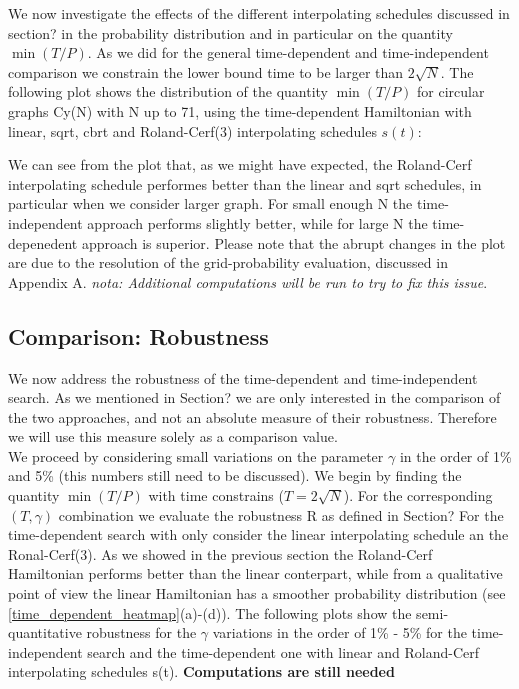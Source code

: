 
        We now investigate the effects of the different interpolating schedules discussed in section? in the probability distribution and in particular on the quantity $\min(T/P)$. As we did for the general time-dependent and time-independent comparison we constrain the lower bound time to be larger than $2\sqrt{N}$.
        The following plot shows the distribution of the quantity $\min(T/P)$ for circular graphs Cy(N) with N up to 71, using the time-dependent Hamiltonian with linear, sqrt, cbrt and Roland-Cerf(3) interpolating schedules $s(t)$:



        \noindent
        We can see from the plot that, as we might have expected, the Roland-Cerf interpolating schedule performes better than the linear and sqrt schedules, in particular when we consider larger graph. For small enough N the time-independent approach performs slightly better, while for large N the time-depenedent approach is superior. Please note that the abrupt changes in the plot are due to the resolution of the grid-probability evaluation, discussed in Appendix A. \textit{nota: Additional computations will be run to try to fix this issue}.


    \subsection{Comparison: Robustness}
    We now address the robustness of the time-dependent and time-independent search. As we mentioned in Section? we are only interested in the comparison of the two approaches, and not an absolute measure of their robustness. Therefore we will use this measure solely as a comparison value. \\
    We proceed by considering small variations on the parameter $\gamma$ in the order of 1\% and 5\% (this numbers still need to be discussed). We begin by finding the quantity $\min(T/P)$ with time constrains ($T = 2\sqrt{N}$). For the corresponding $(T,\gamma)$ combination we evaluate the robustness R as defined in Section?
    For the time-dependent search with only consider the linear interpolating schedule an the Ronal-Cerf(3). As we showed in the previous section the Roland-Cerf Hamiltonian performs better than the linear conterpart, while from a qualitative point of view the linear Hamiltonian has a smoother probability distribution (see \cref{time_dependent_heatmap}(a)-(d)). The following plots show the semi-quantitative robustness for the $\gamma$ variations in the order of 1\% - 5\% for the time-independent search and the time-dependent one with linear and Roland-Cerf interpolating schedules s(t). \textbf{Computations are still needed}

